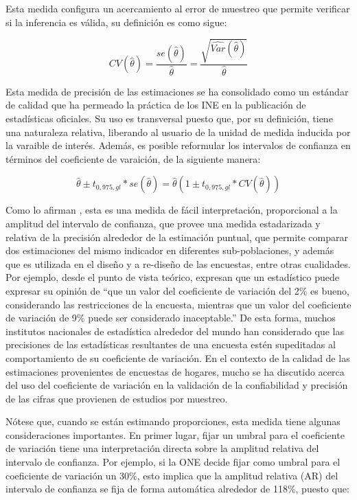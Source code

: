 \documentclass[
  12pt,
  spanish,
]{book}
\begin{document}
Esta medida configura un acercamiento al error de muestreo que permite verificar si la inferencia es válida, su definición es como sigue:

\[
CV(\hat\theta) = \frac{se(\hat\theta)}{\hat\theta} = \frac{\sqrt{\widehat{Var}(\hat\theta)}}{\hat\theta}
\]

Esta medida de precisión de las estimaciones se ha consolidado como un estándar de calidad que ha permeado la práctica de los INE en la publicación de estadísticas oficiales. Su uso es transversal puesto que, por su definición, tiene una naturaleza relativa, liberando al usuario de la unidad de medida inducida por la varaible de interés. Además, es posible reformular los intervalos de confianza en términos del coeficiente de varaición, de la siguiente manera:

\[
\hat\theta \pm t_{0,975, gl} * se(\hat\theta) = \hat\theta  \left(1 \pm t_{0,975, gl} * CV(\hat\theta)\right)
\]

Como lo afirman \citet{Singh_Westlake_Feder_2004}, esta es una medida de fácil interpretación, proporcional a la amplitud del intervalo de confianza, que provee una medida estadarizada y relativa de la precisión alrededor de la estimación puntual, que permite comparar dos estimaciones del mismo indicador en diferentes sub-poblaciones, y además que es utilizada en el diseño y a re-diseño de las encuestas, entre otras cualidades. Por ejemplo, desde el punto de vista teórico, \citet{Sarndal_Swensson_Wretman_2003} expresan que un estadístico puede expresar su opinión de ``que un valor del coeficiente de variación del 2\% es bueno, considerando las restricciones de la encuesta, mientras que un valor del coeficiente de variación de 9\% puede ser considerado inaceptable.'' De esta forma, muchos institutos nacionales de estadística alrededor del mundo han considerado que las precisiones de las estadísticas resultantes de una encuesta estén supeditadas al comportamiento de su coeficiente de variación. En el contexto de la calidad de las estimaciones provenientes de encuestas de hogares, mucho se ha discutido acerca del uso del coeficiente de variación en la validación de la confiabilidad y precisión de las cifras que provienen de estudios por muestreo.

Nótese que, cuando se están estimando proporciones, esta medida tiene algunas consideraciones importantes. En primer lugar, fijar un umbral para el coeficiente de variación tiene una interpretación directa sobre la amplitud relativa del intervalo de confianza. Por ejemplo, si la ONE decide fijar como umbral para el coeficiente de variación un 30\%, esto implica que la amplitud relativa (AR) del intervalo de confianza se fija de forma automática alrededor de 118\%, puesto que:
\end{document}
